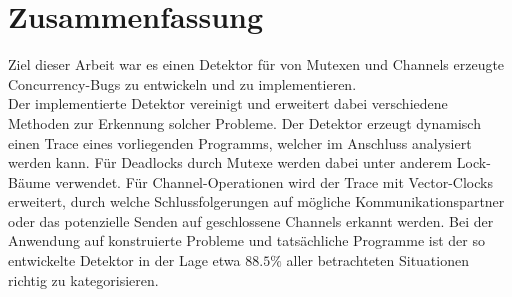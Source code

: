 \chapter{Zusammenfassung}\label{chap:conclusion}
Ziel dieser Arbeit war es einen Detektor für von Mutexen 
und Channels erzeugte Concurrency-Bugs zu entwickeln und zu implementieren.\\
Der implementierte Detektor vereinigt und erweitert dabei verschiedene Methoden 
zur Erkennung solcher Probleme. Der Detektor erzeugt dynamisch einen Trace 
eines vorliegenden Programms, welcher im Anschluss analysiert werden kann.
Für Deadlocks durch Mutexe werden dabei unter anderem Lock-Bäume verwendet. 
Für Channel-Operationen wird der Trace mit Vector-Clocks erweitert, 
durch welche Schlussfolgerungen auf mögliche Kommunikationspartner oder 
das potenzielle Senden auf geschlossene Channels erkannt werden. 
Bei der Anwendung auf konstruierte Probleme und tatsächliche Programme 
ist der so entwickelte Detektor in der Lage etwa $88.5\%$ aller betrachteten 
Situationen richtig zu kategorisieren. 